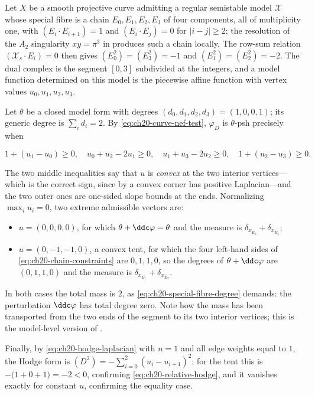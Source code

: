 \begin{example}
\label{ex:ch20-chain-three}
Let \(X\) be a smooth projective curve admitting a regular semistable model
\(\mathcal X\) whose special fibre is a chain
\(E_0,E_1,E_2,E_3\) of four components, all of multiplicity one, with
\((E_{i}\cdot E_{i+1})=1\) and \((E_i\cdot E_j)=0\) for \(|i-j|\geq2\); the
resolution of the \(A_2\) singularity \(xy=\pi^3\) in
 produces such a chain locally.  The row-sum relation
\((\mathcal X_s\cdot E_i)=0\) then gives \((E_0^2)=(E_3^2)=-1\) and
\((E_1^2)=(E_2^2)=-2\).  The dual complex is the segment \([0,3]\)
subdivided at the integers, and a model function determined on this model is
the piecewise affine function with vertex values \(u_0,u_1,u_2,u_3\).

Let \(\theta\) be a closed model form with degrees
\((d_0,d_1,d_2,d_3)=(1,0,0,1)\); its generic degree is
\(\sum_id_i=2\).  By \eqref{eq:ch20-curve-nef-test}, \(\varphi_D\) is
\(\theta\)-psh precisely when

\begin{equation}
\label{eq:ch20-chain-constraints}
 1+(u_1-u_0)\geq0,\quad
 u_0+u_2-2u_1\geq0,\quad
 u_1+u_3-2u_2\geq0,\quad
 1+(u_2-u_3)\geq0 .
\end{equation}

The two middle inequalities say that \(u\) is \emph{convex} at the two
interior vertices---which is the correct sign, since by
 a convex corner has positive
Laplacian---and the two outer ones are one-sided slope bounds at the ends.
Normalizing \(\max_iu_i=0\), two extreme admissible vectors are:

\begin{itemize}
\item \(u=(0,0,0,0)\), for which \(\theta+\ddc\varphi=\theta\) and the
 measure is \(\delta_{x_{E_0}}+\delta_{x_{E_3}}\);
\item \(u=(0,-1,-1,0)\), a convex tent, for which the four left-hand sides of
 \eqref{eq:ch20-chain-constraints} are \(0,1,1,0\), so the degrees of
 \(\theta+\ddc\varphi\) are \((0,1,1,0)\) and the measure is
 \(\delta_{x_{E_1}}+\delta_{x_{E_2}}\).
\end{itemize}

In both cases the total mass is \(2\), as
\eqref{eq:ch20-special-fibre-degree} demands: the perturbation
\(\ddc\varphi\) has total degree zero.  Note how the mass has been
transported from the two ends of the segment to its two interior vertices;
this is the model-level version of .

Finally, by \eqref{eq:ch20-hodge-laplacian} with \(n=1\) and all edge
weights equal to \(1\), the Hodge form is
\((D^2)=-\sum_{i=0}^{2}(u_i-u_{i+1})^2\); for the tent this is
\(-\bigl(1+0+1\bigr)=-2<0\), confirming
\eqref{eq:ch20-relative-hodge}, and it vanishes exactly for constant \(u\),
confirming the equality case.
\end{example}

